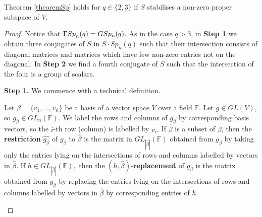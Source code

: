 \begin{Th}
\label{Spq23}
Theorem {\rm\ref{theoremSp}} holds for
 $q \in \{2,3\}$ if $S$ stabilises a non-zero proper subspace of $V$.
\end{Th}
\begin{proof}
Notice that ${{\Gamma Sp}}_n(q)=GSp_n(q).$ As in the case $q>3$, in {\bf Step 1}  we  obtain three conjugates of $S$ in $S \cdot Sp_n(q)$ such that their intersection consists of diagonal matrices and matrices which have few non-zero entries not on the diagonal. In {\bf Step 2} we find a fourth conjugate of $S$ such that the intersection of the four is a group of scalars.


\medskip

{\bf Step 1.} 
We commence with a technical definition.
\begin{Def}
Let $\beta=\{v_1, \ldots, v_n\}$ be a basis of a vector space $V$ over a field $\mathbb{F}$. Let $g \in GL(V)$, so $g_{\beta} \in GL_n(\mathbb{F}).$ We label the rows and columns of $g_{\beta}$ by corresponding basis vectors, so the $i$-th row (column) is labelled by $v_i.$ If $\widehat{\beta}$ is a subset of $\beta$, then the {\bf restriction} $\widehat{g_{\beta}}$  of $g_{\beta}$ to  $\widehat{\beta}$ is the matrix in $GL_{|\widehat{\beta}|}(\mathbb{F})$  obtained from $g_{\beta}$ by taking only the entries lying on the intersections of rows and columns labelled by vectors in $\widehat{\beta}.$ If $h\in GL_{|\widehat{\beta}|}(\mathbb{F}),$ then the $(h, \widehat{\beta})$-{\bf replacement} of $g_{\beta}$ is the matrix obtained from $g_{\beta}$ by replacing the entries lying on the intersections of rows and columns labelled by vectors in $\hat{\beta}$ by corresponding entries of $h.$


\end{Def}
\end{proof}

